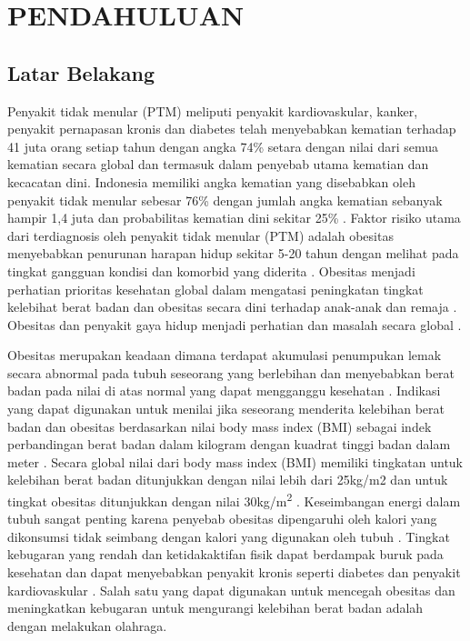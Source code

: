 \chapter{PENDAHULUAN}
\label{chap:pendahuluan}


\section{Latar Belakang}
\label{sec:latarbelakang}

Penyakit tidak menular (PTM) meliputi penyakit kardiovaskular, kanker, penyakit pernapasan kronis dan diabetes telah menyebabkan kematian terhadap 41 juta orang setiap tahun dengan angka 74\% setara dengan nilai dari semua kematian secara global dan termasuk dalam penyebab utama kematian dan kecacatan dini. Indonesia memiliki angka kematian yang disebabkan oleh penyakit tidak menular sebesar 76\% dengan jumlah angka kematian sebanyak hampir 1,4 juta dan probabilitas kematian dini sekitar 25\% \parencite{who1}. Faktor risiko utama dari terdiagnosis oleh penyakit tidak menular (PTM) adalah obesitas menyebabkan penurunan harapan hidup sekitar 5-20 tahun dengan melihat pada tingkat gangguan kondisi dan komorbid yang diderita \parencite{Bluher}. Obesitas menjadi perhatian prioritas kesehatan global dalam mengatasi peningkatan tingkat kelebihat berat badan dan obesitas secara dini terhadap anak-anak dan remaja \parencite{who2}. Obesitas dan penyakit gaya hidup menjadi perhatian dan masalah secara global \parencite{Caballero}.

Obesitas merupakan keadaan dimana terdapat akumulasi penumpukan lemak secara abnormal pada tubuh seseorang yang berlebihan dan menyebabkan berat badan pada nilai di atas normal yang dapat mengganggu kesehatan \parencite{Safaei}. Indikasi yang dapat digunakan untuk menilai jika seseorang menderita kelebihan berat badan dan obesitas berdasarkan nilai body mass index (BMI) sebagai indek perbandingan berat badan dalam kilogram dengan kuadrat tinggi badan dalam meter \parencite{Bohlen}. Secara global nilai dari body mass index (BMI) memiliki tingkatan untuk kelebihan berat badan ditunjukkan dengan nilai lebih dari 25kg/m2 dan untuk tingkat obesitas ditunjukkan dengan nilai 30kg/m\textsuperscript{2} \parencite{Lobstein}. Keseimbangan energi dalam tubuh sangat penting karena penyebab obesitas dipengaruhi oleh kalori yang dikonsumsi tidak seimbang dengan kalori yang digunakan oleh tubuh \parencite{Kevin}. Tingkat kebugaran yang rendah dan ketidakaktifan fisik dapat berdampak buruk pada kesehatan dan dapat menyebabkan penyakit kronis seperti diabetes dan penyakit kardiovaskular \parencite{Anderson}. Salah satu yang dapat digunakan untuk mencegah obesitas dan meningkatkan kebugaran untuk mengurangi kelebihan berat badan adalah dengan melakukan olahraga.

